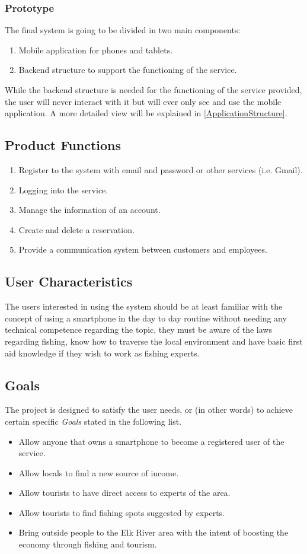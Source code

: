 \subsubsection{Prototype}
The final system is going to be divided in two main components:
\begin{enumerate}
\item Mobile application for phones and tablets.
\item Backend structure to support the functioning of the service.
\end{enumerate}
While the backend structure is needed for the functioning of the service provided, the user will never interact with it but will ever only see and use the mobile application. A more detailed view will be explained in \ref{ApplicationStructure}.
\clearpage
\subsection{Product Functions}
\begin{enumerate}
\item Register to the system with email and password or other services (i.e. Gmail).
\item Logging into the service.
\item Manage the information of an account.
\item Create and delete a reservation.
\item Provide a communication system between customers and employees.
\end{enumerate}
\subsection{User Characteristics}
The users interested in using the system should be at least familiar with the concept of using a smartphone in the day to day routine without needing any technical competence regarding the topic, they must be aware of the laws regarding fishing, know how to traverse the local environment and have basic first aid knowledge if they wish to work as fishing experts.
\subsection{Goals}
The project is designed to satisfy the user needs, or (in other words) to achieve certain specific \emph{Goals} stated in the following list.
\begin{itemize}
\item Allow anyone that owns a smartphone to become a registered user of the service.
\item Allow locals to find a new source of income.
\item Allow tourists to have direct access to experts of the area.
\item Allow tourists to find fishing spots suggested by experts.
\item Bring outside people to the Elk River area with the intent of boosting the economy through fishing and tourism.
\end{itemize}
